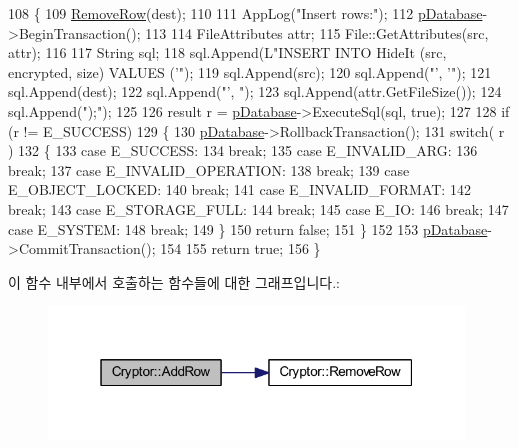 \begin{DoxyCode}
108 \{
109     \hyperlink{class_cryptor_ae50f83111c55db7ea7b2052854bb6bb5}{RemoveRow}(dest);
110 
111     AppLog(\textcolor{stringliteral}{"Insert rows:"});
112     \hyperlink{class_cryptor_af995ba24eee0b7d4b12dbc1eaae049fd}{pDatabase}->BeginTransaction();
113 
114     FileAttributes attr;
115     File::GetAttributes(src, attr);
116 
117     String sql;
118     sql.Append(L\textcolor{stringliteral}{"INSERT INTO HideIt (src, encrypted, size) VALUES ('"});
119     sql.Append(src);
120     sql.Append(\textcolor{stringliteral}{"', '"});
121     sql.Append(dest);
122     sql.Append(\textcolor{stringliteral}{"', "});
123     sql.Append(attr.GetFileSize());
124     sql.Append(\textcolor{stringliteral}{");"});
125 
126     result r = \hyperlink{class_cryptor_af995ba24eee0b7d4b12dbc1eaae049fd}{pDatabase}->ExecuteSql(sql, \textcolor{keyword}{true});
127 
128     \textcolor{keywordflow}{if} (r != E\_SUCCESS)
129     \{
130         \hyperlink{class_cryptor_af995ba24eee0b7d4b12dbc1eaae049fd}{pDatabase}->RollbackTransaction();
131         \textcolor{keywordflow}{switch}( r )
132         \{
133         \textcolor{keywordflow}{case} E\_SUCCESS:
134         \textcolor{keywordflow}{break};
135         \textcolor{keywordflow}{case} E\_INVALID\_ARG:
136         \textcolor{keywordflow}{break};
137         \textcolor{keywordflow}{case} E\_INVALID\_OPERATION:
138         \textcolor{keywordflow}{break};
139         \textcolor{keywordflow}{case} E\_OBJECT\_LOCKED:
140         \textcolor{keywordflow}{break};
141         \textcolor{keywordflow}{case} E\_INVALID\_FORMAT:
142         \textcolor{keywordflow}{break};
143         \textcolor{keywordflow}{case} E\_STORAGE\_FULL:
144         \textcolor{keywordflow}{break};
145         \textcolor{keywordflow}{case} E\_IO:
146         \textcolor{keywordflow}{break};
147         \textcolor{keywordflow}{case} E\_SYSTEM:
148         \textcolor{keywordflow}{break};
149         \}
150         \textcolor{keywordflow}{return} \textcolor{keyword}{false};
151     \}
152 
153     \hyperlink{class_cryptor_af995ba24eee0b7d4b12dbc1eaae049fd}{pDatabase}->CommitTransaction();
154 
155     \textcolor{keywordflow}{return} \textcolor{keyword}{true};
156 \}
\end{DoxyCode}


이 함수 내부에서 호출하는 함수들에 대한 그래프입니다.\+:
\nopagebreak
\begin{figure}[H]
\begin{center}
\leavevmode
\includegraphics[width=313pt]{class_cryptor_a6337e5d4b8034fbe75079e51cf47b0c6_cgraph}
\end{center}
\end{figure}




